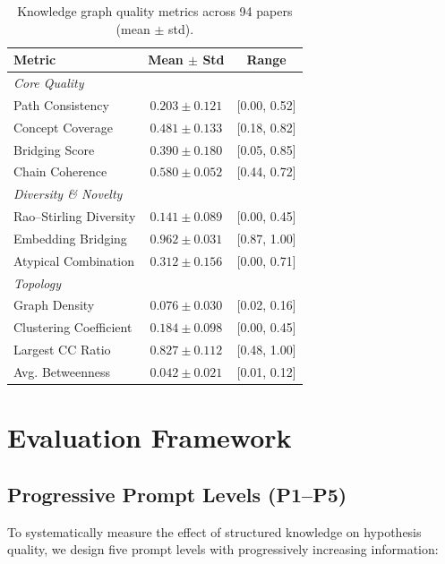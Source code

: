 \documentclass{article}
\begin{document}
\begin{table}[t]
\centering
\caption{Knowledge graph quality metrics across 94 papers (mean $\pm$ std).}
\label{tab:gt_stats}
\small
\begin{tabular}{lcc}
\toprule
\textbf{Metric} & \textbf{Mean $\pm$ Std} & \textbf{Range} \\
\midrule
\multicolumn{3}{l}{\textit{Core Quality}} \\
Path Consistency & $0.203 \pm 0.121$ & [0.00, 0.52] \\
Concept Coverage & $0.481 \pm 0.133$ & [0.18, 0.82] \\
Bridging Score & $0.390 \pm 0.180$ & [0.05, 0.85] \\
Chain Coherence & $0.580 \pm 0.052$ & [0.44, 0.72] \\
\midrule
\multicolumn{3}{l}{\textit{Diversity \& Novelty}} \\
Rao--Stirling Diversity & $0.141 \pm 0.089$ & [0.00, 0.45] \\
Embedding Bridging & $0.962 \pm 0.031$ & [0.87, 1.00] \\
Atypical Combination & $0.312 \pm 0.156$ & [0.00, 0.71] \\
\midrule
\multicolumn{3}{l}{\textit{Topology}} \\
Graph Density & $0.076 \pm 0.030$ & [0.02, 0.16] \\
Clustering Coefficient & $0.184 \pm 0.098$ & [0.00, 0.45] \\
Largest CC Ratio & $0.827 \pm 0.112$ & [0.48, 1.00] \\
Avg. Betweenness & $0.042 \pm 0.021$ & [0.01, 0.12] \\
\bottomrule
\end{tabular}
\end{table}

\section{Evaluation Framework}
\label{sec:eval}

\subsection{Progressive Prompt Levels (P1--P5)}
\label{sec:prompts}

To systematically measure the effect of structured knowledge on hypothesis quality, we design five prompt levels with progressively increasing information:
\end{document}
